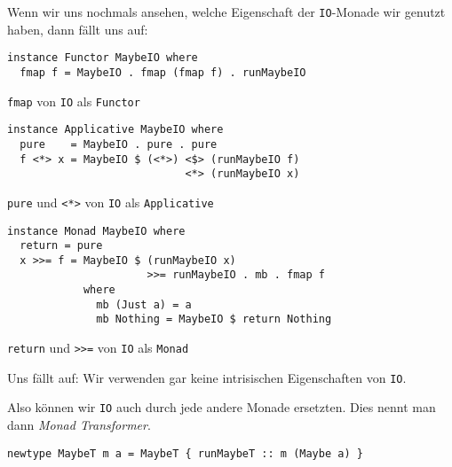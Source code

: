 \documentclass{beamer}
\begin{document}
\begin{frame}[fragile]
Wenn wir uns nochmals ansehen, welche Eigenschaft der \texttt{IO}-Monade wir genutzt haben, dann fällt uns auf:
\pause
\begin{verbatim}
instance Functor MaybeIO where
  fmap f = MaybeIO . fmap (fmap f) . runMaybeIO
\end{verbatim}
\texttt{fmap} von \texttt{IO} als \texttt{Functor}
\pause
\begin{verbatim}
instance Applicative MaybeIO where
  pure    = MaybeIO . pure . pure
  f <*> x = MaybeIO $ (<*>) <$> (runMaybeIO f)
                            <*> (runMaybeIO x)
\end{verbatim}
\texttt{pure} und \texttt{<*>} von \texttt{IO} als \texttt{Applicative}
\pause
\begin{verbatim}
instance Monad MaybeIO where
  return = pure
  x >>= f = MaybeIO $ (runMaybeIO x)
                      >>= runMaybeIO . mb . fmap f
            where
              mb (Just a) = a
              mb Nothing = MaybeIO $ return Nothing
\end{verbatim}
\texttt{return} und \texttt{>>=} von \texttt{IO} als \texttt{Monad}
\end{frame}

\begin{frame}[fragile]
Uns fällt auf: Wir verwenden gar keine intrisischen Eigenschaften von \texttt{IO}.\bigskip

Also können wir \texttt{IO} auch durch jede andere Monade ersetzten. Dies nennt man dann \emph{Monad Transformer}.\bigskip

\begin{verbatim}
newtype MaybeT m a = MaybeT { runMaybeT :: m (Maybe a) }
\end{verbatim}
\end{frame}
\end{document}
